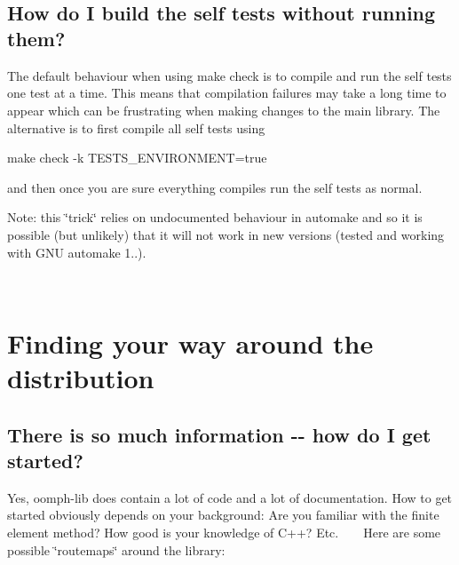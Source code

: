 ~\newline
~\newline
 



~\newline
~\newline
 \hypertarget{index_build_not_run_demos}{}\subsection{How do I build the self tests without running them?}\label{index_build_not_run_demos}
The default behaviour when using {\ttfamily make} {\ttfamily check} is to compile and run the self tests one test at a time. This means that compilation failures may take a long time to appear which can be frustrating when making changes to the main library. The alternative is to first compile all self tests using


\begin{DoxyCode}
make check -k TESTS\_ENVIRONMENT=\textcolor{keyword}{true}
\end{DoxyCode}


and then once you are sure everything compiles run the self tests as normal.

Note\+: this \char`\"{}trick\char`\"{} relies on undocumented behaviour in automake and so it is possible (but unlikely) that it will not work in new versions (tested and working with G\+NU automake 1..).

~\newline
~\newline


 

\hypertarget{index_nav}{}\section{Finding your way around the distribution}\label{index_nav}


\hypertarget{index_too_much}{}\subsection{There is so much information -\/-\/ how do I get started?}\label{index_too_much}
Yes, {\ttfamily oomph-\/lib} does contain a lot of code and a lot of documentation. How to get started obviously depends on your background\+: Are you familiar with the finite element method? How good is your knowledge of C++? Etc. ~\newline
~\newline
Here are some possible \char`\"{}routemaps\char`\"{} around the library\+:


